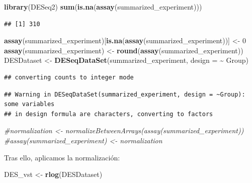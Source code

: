 \documentclass[
]{article}
\newenvironment{Shaded}{\begin{snugshade}}{\end{snugshade}}
\newcommand{\AttributeTok}[1]{\textcolor[rgb]{0.13,0.29,0.53}{#1}}
\newcommand{\CommentTok}[1]{\textcolor[rgb]{0.56,0.35,0.01}{\textit{#1}}}
\newcommand{\DecValTok}[1]{\textcolor[rgb]{0.00,0.00,0.81}{#1}}
\newcommand{\FunctionTok}[1]{\textcolor[rgb]{0.13,0.29,0.53}{\textbf{#1}}}
\newcommand{\NormalTok}[1]{#1}
\newcommand{\OtherTok}[1]{\textcolor[rgb]{0.56,0.35,0.01}{#1}}
\newcommand{\SpecialCharTok}[1]{\textcolor[rgb]{0.81,0.36,0.00}{\textbf{#1}}}
\begin{document}
\begin{Shaded}
\begin{Highlighting}[]
\FunctionTok{library}\NormalTok{(DESeq2)}
\FunctionTok{sum}\NormalTok{(}\FunctionTok{is.na}\NormalTok{(}\FunctionTok{assay}\NormalTok{(summarized\_experiment)))}
\end{Highlighting}
\end{Shaded}

\begin{verbatim}
## [1] 310
\end{verbatim}

\begin{Shaded}
\begin{Highlighting}[]
\FunctionTok{assay}\NormalTok{(summarized\_experiment)[}\FunctionTok{is.na}\NormalTok{(}\FunctionTok{assay}\NormalTok{(summarized\_experiment))] }\OtherTok{\textless{}{-}} \DecValTok{0}
\FunctionTok{assay}\NormalTok{(summarized\_experiment) }\OtherTok{\textless{}{-}} \FunctionTok{round}\NormalTok{(}\FunctionTok{assay}\NormalTok{(summarized\_experiment))}
\NormalTok{DESDataset }\OtherTok{\textless{}{-}} \FunctionTok{DESeqDataSet}\NormalTok{(summarized\_experiment, }\AttributeTok{design =} \SpecialCharTok{\textasciitilde{}}\NormalTok{ Group)}
\end{Highlighting}
\end{Shaded}

\begin{verbatim}
## converting counts to integer mode
\end{verbatim}

\begin{verbatim}
## Warning in DESeqDataSet(summarized_experiment, design = ~Group): some variables
## in design formula are characters, converting to factors
\end{verbatim}

\begin{Shaded}
\begin{Highlighting}[]
\CommentTok{\#normalization \textless{}{-} normalizeBetweenArrays(assay(summarized\_experiment))}
\CommentTok{\#assay(summarized\_experiment) \textless{}{-} normalization}
\end{Highlighting}
\end{Shaded}

Tras ello, aplicamos la normalización:

\begin{Shaded}
\begin{Highlighting}[]
\NormalTok{DES\_vst }\OtherTok{\textless{}{-}} \FunctionTok{rlog}\NormalTok{(DESDataset)}
\end{Highlighting}
\end{Shaded}
\end{document}
